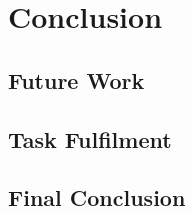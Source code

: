 \chapter{Conclusion}
\label{chp:conclusion} 

\section{Future Work}

\section{Task Fulfilment}

\section{Final Conclusion}